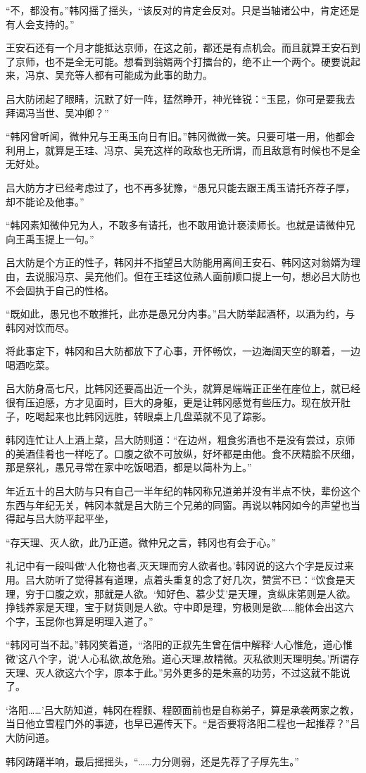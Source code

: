 “不，都没有。”韩冈摇了摇头，“该反对的肯定会反对。只是当轴诸公中，肯定还是有人会支持的。”

王安石还有一个月才能抵达京师，在这之前，都还是有点机会。而且就算王安石到了京师，也不是全无可能。想看到翁婿两个打擂台的，绝不止一个两个。硬要说起来，冯京、吴充等人都有可能成为此事的助力。

吕大防闭起了眼睛，沉默了好一阵，猛然睁开，神光锋锐：“玉昆，你可是要我去拜谒冯当世、吴冲卿？”

“韩冈曾听闻，微仲兄与王禹玉向日有旧。”韩冈微微一笑。只要可堪一用，他都会利用上，就算是王珪、冯京、吴充这样的政敌也无所谓，而且敌意有时候也不是全无好处。

吕大防方才已经考虑过了，也不再多犹豫，“愚兄只能去跟王禹玉请托齐荐子厚，却不能论及他事。”

“韩冈素知微仲兄为人，不敢多有请托，也不敢用诡计亵渎师长。也就是请微仲兄向王禹玉提上一句。”

吕大防是个方正的性子，韩冈并不指望吕大防能用离间王安石、韩冈这对翁婿为理由，去说服冯京、吴充他们。但在王珪这位熟人面前顺口提上一句，想必吕大防也不会固执于自己的性格。

“既如此，愚兄也不敢推托，此亦是愚兄分内事。”吕大防举起酒杯，以酒为约，与韩冈对饮而尽。

将此事定下，韩冈和吕大防都放下了心事，开怀畅饮，一边海阔天空的聊着，一边喝酒吃菜。

吕大防身高七尺，比韩冈还要高出近一个头，就算是端端正正坐在座位上，就已经很有压迫感，方才见面时，巨大的身躯，更是让韩冈感觉有些压力。现在放开肚子，吃喝起来也比韩冈远胜，转眼桌上几盘菜就不见了踪影。

韩冈连忙让人上酒上菜，吕大防则道：“在边州，粗食劣酒也不是没有尝过，京师的美酒佳肴也一样吃了。口腹之欲不可放纵，好坏都是由他。食不厌精脍不厌细，那是祭礼，愚兄寻常在家中吃饭喝酒，都是以简朴为上。”

年近五十的吕大防与只有自己一半年纪的韩冈称兄道弟并没有半点不快，辈份这个东西与年纪无关，韩冈本就是吕大防三个兄弟的同窗。再说以韩冈如今的声望也当得起与吕大防平起平坐，

“存天理、灭人欲，此乃正道。微仲兄之言，韩冈也有会于心。”

礼记中有一段叫做‘人化物也者,灭天理而穷人欲者也。’韩冈说的这六个字是反过来用。吕大防听了觉得甚有道理，点着头重复的念了好几次，赞赏不已：“饮食是天理，穷于口腹之欢，那就是人欲。‘知好色、慕少艾’是天理，贪纵床笫则是人欲。挣钱养家是天理，宝于财货则是人欲。守中即是理，穷极则是欲……能体会出这六个字，玉昆你也算是明理入道了。”

“韩冈可当不起。”韩冈笑着道，“洛阳的正叔先生曾在信中解释‘人心惟危，道心惟微’这八个字，说‘人心私欲,故危殆。道心天理,故精微。灭私欲则天理明矣。’所谓存天理、灭人欲这六个字，原本于此。”另外更多的是朱熹的功劳，不过这就不能说了。

‘洛阳……’吕大防知道，韩冈在程颢、程颐面前也是自称弟子，算是承袭两家之教，当日他立雪程门外的事迹，也早已遍传天下。“是否要将洛阳二程也一起推荐？”吕大防问道。

韩冈踌躇半响，最后摇摇头，“……力分则弱，还是先荐了子厚先生。”

